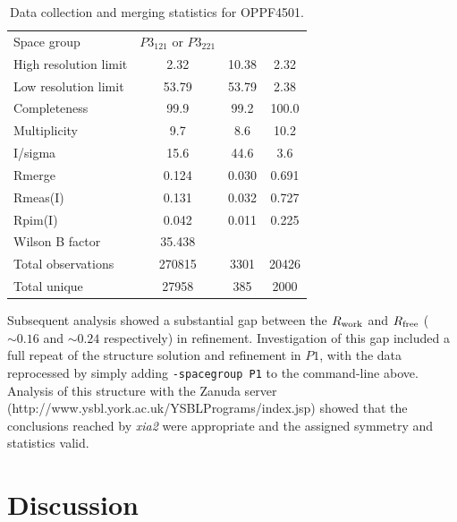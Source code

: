 \documentclass[a4paper, 11pt]{article}
\begin{document}
\begin{table}
\caption{Data collection and merging statistics for OPPF4501.
\label{table:oppf4501}}
\begin{tabular}{lccc}
Space group & $P3_121$ or $P3_221$ & & \\
High resolution limit                   &	  2.32	& 10.38	&  2.32\\
Low resolution limit                    &	 53.79	& 53.79	&  2.38\\
Completeness                            &	 99.9	& 99.2&	100.0\\
Multiplicity                            &	  9.7&	  8.6	& 10.2\\
I/sigma                                 &	 15.6&	 44.6	&  3.6\\
Rmerge                                  &	0.124&	0.030&	0.691\\
Rmeas(I)                                &	0.131&	0.032&	0.727\\
Rpim(I)                                 &	0.042&	0.011&	0.225\\
Wilson B factor                         &	35.438   & & \\
Total observations                      &	270815	&3301&	20426\\
Total unique                            &	27958&	385&	2000\\
\end{tabular}
\end{table}

Subsequent analysis showed a substantial gap between the
$R_{\rm{work}}$ and $R_{\rm{free}}$ ($\sim 0.16$ and $\sim 0.24$
respectively) in refinement. Investigation of this gap included a full repeat
of the structure solution and refinement in $P1$, with the data
reprocessed by simply adding \verb|-spacegroup P1| to the command-line
above. Analysis of this structure with the Zanuda server
(http://www.ysbl.york.ac.uk/YSBLPrograms/index.jsp)
showed that the conclusions reached
by \emph{xia2} were appropriate and the assigned symmetry and
statistics valid.

\section{Discussion}
\end{document}
